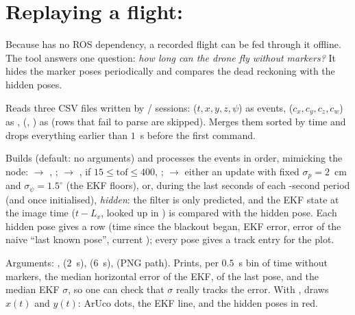 \section[Replaying a flight: ekf\_replay.py]{Replaying a flight: }
\label{sec:replay}

Because  has no ROS dependency, a recorded flight can be fed through it offline. The tool answers one
question: \emph{how long can the drone fly without markers?} It hides the marker poses periodically and compares the dead
reckoning with the hidden poses.

Reads three CSV files written by  /  sessions:
 ($t,x,y,z,\psi$) as  events,  ($c_x,c_y,c_z,c_w$) as ,
 (, ) as  (rows that fail to parse are skipped). Merges them sorted by time
and drops everything earlier than $1$~s before the first command.

Builds  (default: no arguments) and processes the events in order, mimicking the node:
 $\to$ , ;  $\to$ ,  if
$15\le\text{tof}\le400$, ;  $\to$ either an update with fixed
$\sigma_p = 2$~cm and $\sigma_\psi=1.5^\circ$ (the EKF floors), or, during the last  seconds of each
-second period (and once initialised), \emph{hidden}: the filter is only predicted, and the EKF state at the image
time ($t - L_v$, looked up in ) is compared with the hidden pose. Each hidden pose gives a row (time since the
blackout began, EKF error, error of the naive ``last known pose'', current ); every pose gives a track entry
for the plot.

Arguments: ,  ($2$~s),  ($6$~s),  (PNG path). Prints, per $0.5$~s bin
of time without markers, the median horizontal error of the EKF, of the last pose, and the median EKF $\sigma$, so one can
check that $\sigma$ really tracks the error. With , draws $x(t)$ and $y(t)$: ArUco dots, the EKF line, and the
hidden poses in red.

